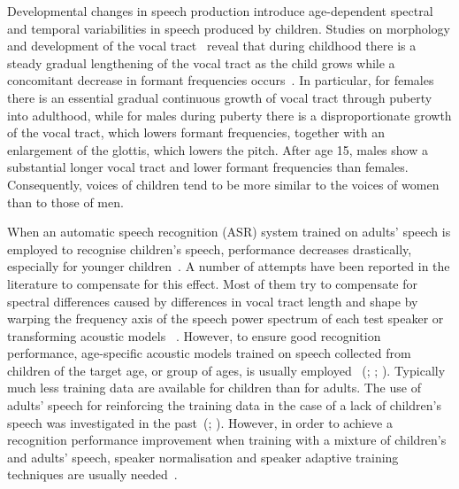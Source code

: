 \documentclass{nle}
\begin{document}
Developmental  changes in  speech  production introduce  age-dependent
spectral and  temporal variabilities  in speech produced  by children.
Studies    on    morphology    and    development   of    the    vocal
tract~\citep*{FitGie99} reveal that during  childhood there is a steady
gradual  lengthening of the  vocal tract  as the  child grows  while a
concomitant        decrease        in       formant        frequencies
occurs~\citep*{HubStaCurAshJoh99,LeePotNar99}.    In   particular,  for
females there is an essential gradual continuous growth of vocal tract
through puberty  into adulthood, while for males  during puberty there
is a disproportionate growth of  the vocal tract, which lowers formant
frequencies, together with an enlargement of the glottis, which lowers
the pitch. After  age 15, males show a  substantial longer vocal tract
and lower formant frequencies than females.  Consequently, voices of
children tend to be more similar  to the voices of women than to those
of men.

When an automatic speech recognition (ASR) system trained  on adults' speech is employed to recognise
children's speech,  performance decreases drastically,  especially for
younger children~\citep*{WilJac96,ClaDolBosCom98,DasNixPic98,LiRus01,GiuGer03,PotNar03,GerGiuBru07,Gerosa2009}.
A number of attempts have been reported in the literature to compensate for this
effect.   Most of  them  try to  compensate  for spectral  differences
caused by differences  in vocal tract length and  shape by warping the
frequency axis  of the speech power  spectrum of each  test speaker or
transforming                      acoustic                      models
~\citep{ClaDolBosCom98,DasNixPic98,PotNar03}.     However,    to
ensure  good  recognition  performance, age-specific  acoustic  models trained on speech collected  from children of the target age, or
group        of         ages,        is        usually        employed
~(\citealp{WilJac96}; \citealp*{HagPelCol03,NisLeeSarShi04}; \citealp{GerGiuBru07}). Typically
much  less   training  data  are  available  for   children  than  for
adults. The use of adults' speech for reinforcing the training data in
the  case of  a  lack of  children's  speech was  investigated in  the
past~(\citealp{WilJac96}; \citealp*{SteSteHacNotNie03}).  However,  in order to achieve
a recognition performance improvement  when training with a mixture of
children's  and  adults'  speech,  speaker normalisation  and  speaker
adaptive      training      techniques are      usually  needed~\citep*{GerGiuBru09}.
\end{document}
